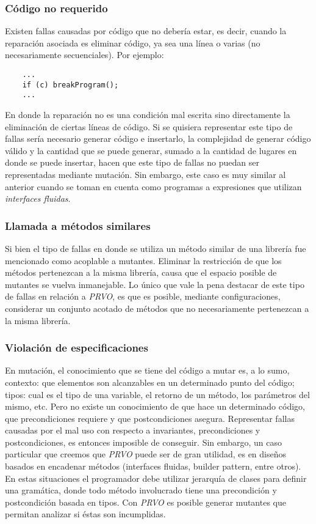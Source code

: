 \subsubsection{C\'odigo no requerido} %

Existen fallas causadas por c\'odigo que no deber\'ia estar, es decir, cuando la reparaci\'on asociada es eliminar c\'odigo, ya sea una l\'inea o varias (no necesariamente secuenciales). Por ejemplo:
\begin{lstlisting}
	...
	if (c) breakProgram();
	...
\end{lstlisting}
En donde la reparaci\'on no es una condici\'on mal escrita sino directamente la eliminaci\'on de ciertas l\'ineas de c\'odigo. Si se quisiera representar este tipo de fallas ser\'ia necesario generar c\'odigo e insertarlo, la complejidad de generar c\'odigo v\'alido y la cantidad que se puede generar, sumado a la cantidad de lugares en donde se puede insertar, hacen que este tipo de fallas no puedan ser representadas mediante mutaci\'on. Sin embargo, este caso es muy similar al anterior cuando se toman en cuenta como programas a expresiones que utilizan \emph{interfaces fluidas}.

\subsubsection{Llamada a m\'etodos similares}

Si bien el tipo de fallas en donde se utiliza un m\'etodo similar de una librer\'ia fue mencionado como acoplable a mutantes. Eliminar la restricci\'on de que los m\'etodos pertenezcan a la misma librer\'ia, causa que el espacio posible de mutantes se vuelva inmanejable. Lo \'unico que vale la pena destacar de este tipo de fallas en relaci\'on a \emph{PRVO}, es que es posible, mediante configuraciones, considerar un conjunto acotado de m\'etodos que no necesariamente pertenezcan a la misma librer\'ia.

\subsubsection{Violaci\'on de especificaciones}
\label{sec:prvo.prvoTargetedFaults.specViolations}

En mutaci\'on, el conocimiento que se tiene del c\'odigo a mutar es, a lo sumo, contexto: que elementos son alcanzables en un determinado punto del c\'odigo; tipos: cual es el tipo de una variable, el retorno de un m\'etodo, los par\'ametros del mismo, etc. Pero no existe un conocimiento de que hace un determinado c\'odigo, que precondiciones requiere y que postcondiciones asegura. Representar fallas causadas por el mal uso con respecto a invariantes, precondiciones y postcondiciones, es entonces imposible de conseguir. Sin embargo, un caso particular que creemos que \emph{PRVO} puede ser de gran utilidad, es en dise\~nos basados en encadenar m\'etodos (interfaces fluidas, builder pattern, entre otros). En estas situaciones el programador debe utilizar jerarqu\'ia de clases para definir una gram\'atica, donde todo m\'etodo involucrado tiene una precondici\'on y postcondici\'on basada en tipos. Con \emph{PRVO} es posible generar mutantes que permitan analizar si \'estas son incumplidas.

